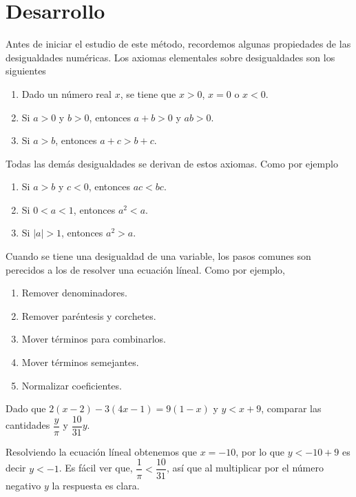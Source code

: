 \section{Desarrollo}

Antes de iniciar el estudio de este método, recordemos algunas propiedades de las desigualdades numéricas.
Los axiomas elementales sobre desigualdades son los siguientes

\begin{enumerate}
    \item Dado un número real $x$, se tiene que $x > 0$, $x = 0$ o $x < 0$.
    \item Si $a > 0$ y $b > 0$, entonces $a + b > 0$ y $ab > 0$.
    \item Si $a > b$, entonces $a + c > b + c$.
\end{enumerate}
Todas las demás desigualdades se derivan de estos axiomas.
Como por ejemplo
\begin{enumerate}
    \item Si $a > b$ y $c < 0$, entonces $ac < bc$.
    \item Si $0 < a < 1$, entonces $a^2 < a$.
    \item Si $|a| > 1$, entonces $a^2 > a$.
\end{enumerate}

Cuando se tiene una desigualdad de una variable, los pasos comunes son perecidos a los de resolver una ecuación líneal.
Como por ejemplo,
\begin{multicols}{2}
    \begin{enumerate}
        \item Remover denominadores.
        \item Remover paréntesis y corchetes.
        \item Mover términos para combinarlos.
        \item Mover términos semejantes.
        \item Normalizar coeficientes.
    \end{enumerate}
\end{multicols}

\begin{example}
    Dado que $2(x - 2) - 3(4x - 1) = 9(1 - x)$ y $y < x + 9$, comparar las cantidades $\dfrac{y}{\pi}$ y $\dfrac{10}{31}y$.
\end{example}
\begin{solution}
    Resolviendo la ecuación líneal obtenemos que $x = -10$, por lo que $y < -10 + 9$ es decir $y < -1$.
    Es fácil ver que, $\dfrac{1}{\pi} < \dfrac{10}{31}$, así que al multiplicar por el número negativo $y$ la respuesta es clara.
\end{solution}

